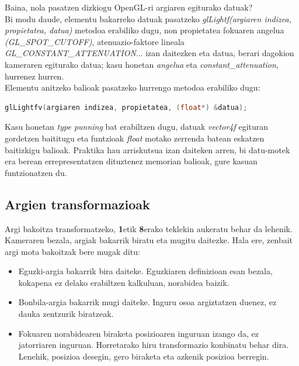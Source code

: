 \documentclass[12pt]{article}
\newcommand{\metodo}[1] {\textit{#1}}
\newcommand{\aldagai}[1] {\textit{#1}}
\newcommand{\tekla}[1] {\textbf{#1}}
\begin{document}
Baina, nola pasatzen dizkiogu OpenGL-ri argiaren egiturako datuak?\\
Bi modu daude, elementu bakarreko datuak pasatzeko \metodo{glLightf(argiaren indizea, propietatea, datua)} metodoa erabiliko dugu, non 
propietatea fokuaren angelua \textit{(GL\_SPOT\_CUTOFF)}, atenuazio-faktore lineala \textit{GL\_CONSTANT\_ATTENUATION}... izan daitezken eta datua, berari dagokion kameraren egiturako datua; kasu honetan \aldagai{angelua} eta \aldagai{constant\_attenuation}, hurrenez hurren.\\

Elementu anitzeko balioak pasatzeko hurrengo metodoa erabiliko dugu:
\begin{lstlisting}[language=C]
glLightfv(argiaren indizea, propietatea, (float*) &datua);
\end{lstlisting}
Kasu honetan \textit{type punning}\cite{punning} bat erabiltzen dugu, datuak \aldagai{vector4f} egituran gordetzen baititugu eta funtzioak \aldagai{float} motako zerrenda batean eskatzen baitizkigu balioak. Praktika hau arriskutsua izan daiteken arren, bi datu-motek era berean errepresentatzen dituztenez memorian balioak, gure kasuan funtzionatzen du.

\subsection{Argien transformazioak}

Argi bakoitza transformatzeko, \tekla{1}etik \tekla{8}erako teklekin aukeratu behar da lehenik. Kameraren bezala, argiak bakarrik biratu eta mugitu daitezke. Hala ere, zenbait argi mota bakoitzak bere mugak ditu:

\begin{itemize}
\item Eguzki-argia bakarrik bira daiteke. Eguzkiaren definizioan esan bezala, kokapena ez delako erabiltzen kalkuluan, norabidea baizik.

\item Bonbila-argia bakarrik mugi daiteke. Inguru osoa argiztatzen duenez, ez dauka zentzurik biratzeak.

\item Fokuaren norabidearen biraketa posizioaren inguruan izango da, ez jatorriaren inguruan. Horretarako hiru transformazio konbinatu behar dira. Lenehik, posizioa desegin, gero biraketa eta azkenik posizioa berregin.

\end{itemize}
\end{document}
